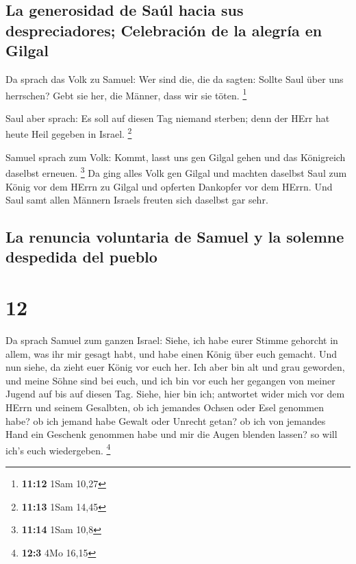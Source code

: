 \hypertarget{la-generosidad-de-sauxfal-hacia-sus-despreciadores-celebraciuxf3n-de-la-alegruxeda-en-gilgal}{%
\subsection{La generosidad de Saúl hacia sus despreciadores; Celebración
de la alegría en
Gilgal}\label{la-generosidad-de-sauxfal-hacia-sus-despreciadores-celebraciuxf3n-de-la-alegruxeda-en-gilgal}}

 Da sprach das Volk zu Samuel: Wer sind die, die da
sagten: Sollte Saul über uns herrschen? Gebt sie her, die Männer, dass
wir sie töten. \footnote{\textbf{11:12} 1Sam 10,27}

 Saul aber sprach: Es soll auf diesen Tag niemand
sterben; denn der HErr hat heute Heil gegeben in Israel. \footnote{\textbf{11:13}
  1Sam 14,45}

 Samuel sprach zum Volk: Kommt, lasst uns gen Gilgal
gehen und das Königreich daselbst erneuen. \footnote{\textbf{11:14} 1Sam
  10,8}  Da ging alles Volk gen Gilgal und machten
daselbst Saul zum König vor dem HErrn zu Gilgal und opferten Dankopfer
vor dem HErrn. Und Saul samt allen Männern Israels freuten sich daselbst
gar sehr.

\hypertarget{la-renuncia-voluntaria-de-samuel-y-la-solemne-despedida-del-pueblo}{%
\subsection{La renuncia voluntaria de Samuel y la solemne despedida del
pueblo}\label{la-renuncia-voluntaria-de-samuel-y-la-solemne-despedida-del-pueblo}}

\hypertarget{section-11}{%
\section{12}\label{section-11}}

 Da sprach Samuel zum ganzen Israel: Siehe, ich habe eurer
Stimme gehorcht in allem, was ihr mir gesagt habt, und habe einen König
über euch gemacht.  Und nun siehe, da zieht euer König vor
euch her. Ich aber bin alt und grau geworden, und meine Söhne sind bei
euch, und ich bin vor euch her gegangen von meiner Jugend auf bis auf
diesen Tag.  Siehe, hier bin ich; antwortet wider mich vor
dem HErrn und seinem Gesalbten, ob ich jemandes Ochsen oder Esel
genommen habe? ob ich jemand habe Gewalt oder Unrecht getan? ob ich von
jemandes Hand ein Geschenk genommen habe und mir die Augen blenden
lassen? so will ich's euch wiedergeben. \footnote{\textbf{12:3} 4Mo
  16,15}

